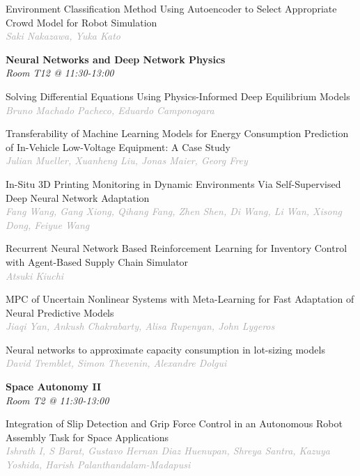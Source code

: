 \begin{multicols*}{2}
\small Environment Classification Method Using Autoencoder to Select Appropriate Crowd Model for Robot Simulation\\ 
\footnotesize \textcolor{darkgray}{\textit{Saki Nakazawa, Yuka  Kato}}

\normalsize \textbf{Neural Networks and Deep Network Physics}\\
\small \textit{Room T12 @ 11:30-13:00}

\small Solving Differential Equations Using Physics-Informed Deep Equilibrium Models\\ 
\footnotesize \textcolor{darkgray}{\textit{Bruno Machado Pacheco, Eduardo  Camponogara}}

\small Transferability of Machine Learning Models for Energy Consumption Prediction of In-Vehicle Low-Voltage Equipment: A Case Study\\ 
\footnotesize \textcolor{darkgray}{\textit{Julian Mueller, Xuanheng  Liu, Jonas  Maier, Georg  Frey}}

\small In-Situ 3D Printing Monitoring in Dynamic Environments Via Self-Supervised Deep Neural Network Adaptation\\ 
\footnotesize \textcolor{darkgray}{\textit{Fang Wang, Gang  Xiong, Qihang  Fang, Zhen  Shen, Di  Wang, Li  Wan, Xisong  Dong, Feiyue  Wang}}

\small Recurrent Neural Network Based Reinforcement Learning for Inventory Control with Agent-Based Supply Chain Simulator\\ 
\footnotesize \textcolor{darkgray}{\textit{Atsuki Kiuchi}}

\small MPC of Uncertain Nonlinear Systems with Meta-Learning for Fast Adaptation of Neural Predictive Models\\ 
\footnotesize \textcolor{darkgray}{\textit{Jiaqi Yan, Ankush  Chakrabarty, Alisa  Rupenyan, John  Lygeros}}

\small Neural networks to approximate capacity consumption in lot-sizing models\\ 
\footnotesize \textcolor{darkgray}{\textit{David Tremblet, Simon  Thevenin, Alexandre  Dolgui}}

\normalsize \textbf{Space Autonomy II}\\
\small \textit{Room T2 @ 11:30-13:00}

\small Integration of Slip Detection and Grip Force Control in an Autonomous Robot Assembly Task for Space Applications\\ 
\footnotesize \textcolor{darkgray}{\textit{Ishrath I, S  Barat, Gustavo Hernan  Diaz Huenupan, Shreya  Santra, Kazuya  Yoshida, Harish  Palanthandalam-Madapusi}}


\end{multicols*}

